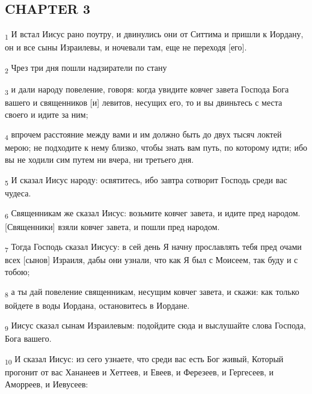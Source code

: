 \subsection{CHAPTER 3}
\begin{tcolorbox}
\textsubscript{1} И встал Иисус рано поутру, и двинулись они от Ситтима и пришли к Иордану, он и все сыны Израилевы, и ночевали там, еще не переходя [его].
\end{tcolorbox}
\begin{tcolorbox}
\textsubscript{2} Чрез три дня пошли надзиратели по стану
\end{tcolorbox}
\begin{tcolorbox}
\textsubscript{3} и дали народу повеление, говоря: когда увидите ковчег завета Господа Бога вашего и священников [и] левитов, несущих его, то и вы двиньтесь с места своего и идите за ним;
\end{tcolorbox}
\begin{tcolorbox}
\textsubscript{4} впрочем расстояние между вами и им должно быть до двух тысяч локтей мерою; не подходите к нему близко, чтобы знать вам путь, по которому идти; ибо вы не ходили сим путем ни вчера, ни третьего дня.
\end{tcolorbox}
\begin{tcolorbox}
\textsubscript{5} И сказал Иисус народу: освятитесь, ибо завтра сотворит Господь среди вас чудеса.
\end{tcolorbox}
\begin{tcolorbox}
\textsubscript{6} Священникам же сказал Иисус: возьмите ковчег завета, и идите пред народом. [Священники] взяли ковчег завета, и пошли пред народом.
\end{tcolorbox}
\begin{tcolorbox}
\textsubscript{7} Тогда Господь сказал Иисусу: в сей день Я начну прославлять тебя пред очами всех [сынов] Израиля, дабы они узнали, что как Я был с Моисеем, так буду и с тобою;
\end{tcolorbox}
\begin{tcolorbox}
\textsubscript{8} а ты дай повеление священникам, несущим ковчег завета, и скажи: как только войдете в воды Иордана, остановитесь в Иордане.
\end{tcolorbox}
\begin{tcolorbox}
\textsubscript{9} Иисус сказал сынам Израилевым: подойдите сюда и выслушайте слова Господа, Бога вашего.
\end{tcolorbox}
\begin{tcolorbox}
\textsubscript{10} И сказал Иисус: из сего узнаете, что среди вас есть Бог живый, Который прогонит от вас Хананеев и Хеттеев, и Евеев, и Ферезеев, и Гергесеев, и Аморреев, и Иевусеев:
\end{tcolorbox}
